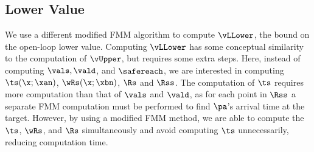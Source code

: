 \subsection{Lower Value}

We use a different modified FMM algorithm to compute $\vLLower$, the bound on the open-loop lower value.
Computing $\vLLower$ has some conceptual similarity to the computation of $\vUpper$, but requires some extra steps.
Here, instead of computing $\vals, \vald$, and $\safereach$, we are interested in computing $\ts(\x;\xan)$, $\wRs(\x;\xbn)$, $\Rs$ and $\Rss$.
The computation of $\ts$ requires more computation than that of $\vals$ and $\vald$, as for each point in $\Rss$ a separate FMM computation must be performed to find $\pa$'s arrival time at the target.
However, by using a modified FMM method, we are able to compute the $\ts$, $\wRs$, and $\Rs$ simultaneously and avoid computing $\ts$ unnecessarily, reducing computation time.
 
